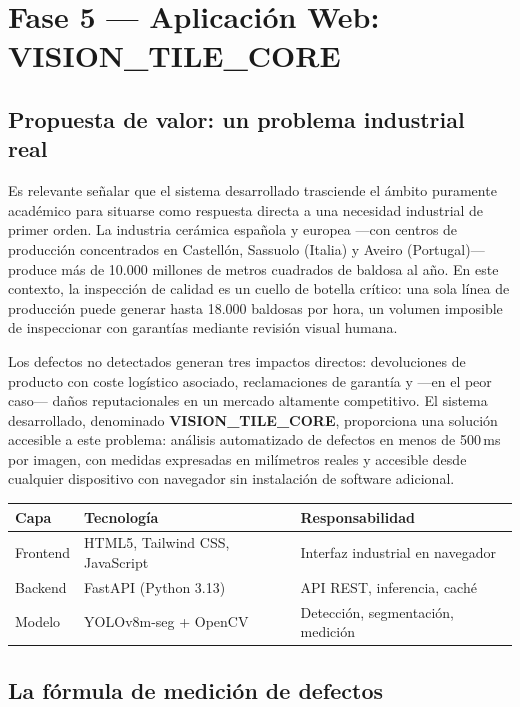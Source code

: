 \documentclass[12pt,a4paper]{article}
\begin{document}
\section{Fase 5 — Aplicación Web: VISION\_TILE\_CORE}

\subsection{Propuesta de valor: un problema industrial real}

Es relevante señalar que el sistema desarrollado trasciende el ámbito puramente
académico para situarse como respuesta directa a una necesidad industrial de primer
orden. La industria cerámica española y europea —con centros de producción concentrados
en Castellón, Sassuolo (Italia) y Aveiro (Portugal)— produce más de 10.000 millones de
metros cuadrados de baldosa al año. En este contexto, la inspección de calidad es un
cuello de botella crítico: una sola línea de producción puede generar hasta 18.000
baldosas por hora, un volumen imposible de inspeccionar con garantías mediante
revisión visual humana.

Los defectos no detectados generan tres impactos directos: devoluciones de producto
con coste logístico asociado, reclamaciones de garantía y —en el peor caso— daños
reputacionales en un mercado altamente competitivo. El sistema desarrollado,
denominado \textbf{VISION\_TILE\_CORE}, proporciona una solución accesible a este
problema: análisis automatizado de defectos en menos de 500\,ms por imagen,
con medidas expresadas en milímetros reales y accesible desde cualquier dispositivo
con navegador sin instalación de software adicional.

\begin{center}
\begin{tabular}{lll}
  \toprule
  \textbf{Capa} & \textbf{Tecnología} & \textbf{Responsabilidad} \\
  \midrule
  Frontend & HTML5, Tailwind CSS, JavaScript & Interfaz industrial en navegador \\
  Backend  & FastAPI (Python 3.13)           & API REST, inferencia, caché \\
  Modelo   & YOLOv8m-seg + OpenCV            & Detección, segmentación, medición \\
  \bottomrule
\end{tabular}
\end{center}

\subsection{La fórmula de medición de defectos}
\end{document}
